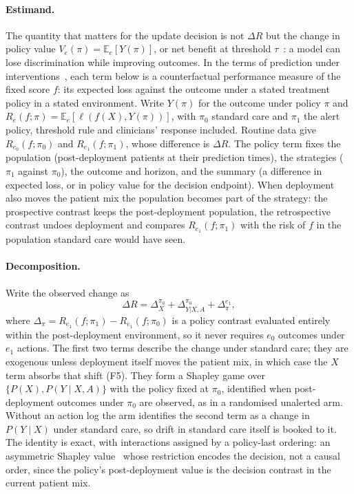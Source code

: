 \documentclass[letterpaper]{article} %
\newcommand{\E}{\mathbb{E}}
\begin{document}
\paragraph{Estimand.} The quantity that matters for the update decision is
not $\Delta R$ but the change in policy value $V_e(\pi) = \E_e[Y(\pi)]$, or
net benefit at threshold $\tau$~\citep{vickers2006decision}: a model can lose
discrimination while improving outcomes. In the terms of prediction under
interventions~\citep{keogh2024prediction, luijken2024estimands}, each term
below is a counterfactual performance measure of the fixed score $f$: its
expected loss against the outcome under a stated treatment policy in a stated
environment. Write $Y(\pi)$ for the outcome under policy $\pi$ and
$R_e(f; \pi) = \E_e[\ell(f(X), Y(\pi))]$, with $\pi_0$ standard care and
$\pi_1$ the alert policy, threshold rule and clinicians' response included.
Routine data give $R_{e_0}(f; \pi_0)$ and $R_{e_1}(f; \pi_1)$, whose
difference is $\Delta R$. The policy term fixes the population
(post-deployment patients at their prediction times), the strategies ($\pi_1$
against $\pi_0$), the outcome and horizon, and the summary (a difference in
expected loss, or in policy value for the decision endpoint). When deployment
also moves the patient mix the population becomes part of the strategy:
the prospective contrast keeps the post-deployment population, the
retrospective contrast undoes deployment and compares $R_{e_1}(f; \pi_1)$ with
the risk of $f$ in the population standard care would have seen.

\paragraph{Decomposition.} Write the observed change as
\begin{equation}
\Delta R = \Delta_X^{\pi_0} + \Delta_{Y|X,A}^{\pi_0}
          + \Delta_{\pi}^{e_1},
\label{eq:decomp}
\end{equation}
where $\Delta_\pi = R_{e_1}(f; \pi_1) - R_{e_1}(f; \pi_0)$ is a policy contrast
evaluated entirely within the post-deployment environment, so it never requires
$e_0$ outcomes under $e_1$ actions. The first two terms describe the change
under standard care; they are exogenous unless deployment itself moves the
patient mix, in which case the $X$ term absorbs that shift (F5). They form a
Shapley game over $\{P(X), P(Y \mid X, A)\}$ with the policy fixed at $\pi_0$,
identified when post-deployment outcomes under $\pi_0$ are observed, as in a
randomised unalerted arm. Without an action log the arm identifies the second
term as a change in $P(Y \mid X)$ under standard care, so drift in standard
care itself is booked to it. The identity is exact, with interactions assigned by
a policy-last ordering: an asymmetric Shapley value~\citep{frye2020asymmetric}
whose restriction encodes the decision, not a causal order, since the policy's
post-deployment value is the decision contrast in the current patient mix.
\end{document}
